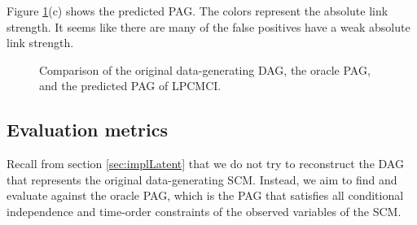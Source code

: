 \documentclass[conference]{IEEEtran}
\begin{document}
Figure \ref{fig:predicted}(c) shows the predicted PAG. The colors represent the absolute link strength. 
It seems like there are many of the false positives have a weak absolute link strength.
\begin{figure}[htbp]
    \centering
        \hspace{5mm}
             \hspace{50mm}
    \caption{Comparison of the original data-generating DAG, the oracle PAG, and the predicted PAG of LPCMCI.}
        \label{fig:predicted}
\end{figure}

\subsection{Evaluation metrics}
\label{sec:eval}
Recall from section \ref{sec:implLatent} that we do not try to reconstruct the DAG that represents the original data-generating SCM. Instead, we aim to find and evaluate against the oracle PAG, which is the PAG that satisfies all conditional independence and time-order constraints of the observed variables of the SCM. 
\end{document}
